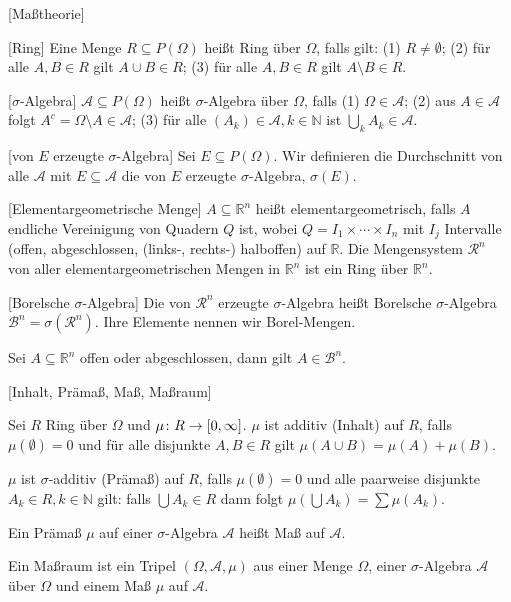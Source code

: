 \documentclass[fleqn,draft,a5paper]{article}
\theoremstyle{remark}
\begin{document}
[Maßtheorie]

[Ring]  Eine Menge \(R \subseteq P(\Omega)\) heißt Ring über \(\Omega\), falls gilt: (1) \(R
\ne \emptyset\); (2) für alle \(A, B \in R\) gilt \(A \cup B \in R\); (3) für alle \(A, B \in
R\) gilt \(A \setminus B \in R\).

[\(\sigma\)-Algebra]  \(\mathcal{A} \subseteq P(\Omega)\) heißt \(\sigma\)-Algebra über \(\Omega\), falls (1) \(\Omega \in
\mathcal{A}\); (2) aus \(A \in \mathcal{A}\) folgt \(A^{c} = \Omega \setminus A \in \mathcal{A}\); (3) für alle
\((A_{k}) \in \mathcal{A}, k \in \mathbb{N}\) ist \(\bigcup_{k}A_{k} \in \mathcal{A}\).

[von \(E\) erzeugte \(\sigma\)-Algebra] Sei \(E \subseteq P(\Omega)\).  Wir definieren
die Durchschnitt von alle \(\mathcal{A}\) mit \(E \subseteq \mathcal{A}\) die von \(E\) erzeugte
\(\sigma\)-Algebra, \(\sigma(E)\).

[Elementargeometrische Menge] \(A \subseteq \mathbb{R}^{n}\) heißt elementargeometrisch,
falls \(A\) endliche Vereinigung von Quadern \(Q\) ist, wobei
\(Q = I_{1} \times \cdots \times I_{n}\) mit \(I_{j}\) Intervalle (offen, abgeschlossen,
(links-, rechts-) halboffen) auf \(\mathbb{R}\).  Die Mengensystem
\(\mathcal{R}^{n}\) von aller elementargeometrischen Mengen in
\(\mathbb{R}^{n}\) ist ein Ring über \(\mathbb{R}^{n}\).

[Borelsche \(\sigma\)-Algebra] Die von \(\mathcal{R}^{n}\) erzeugte \(\sigma\)-Algebra heißt
Borelsche \(\sigma\)-Algebra \(\mathcal{B}^{n} = \sigma(\mathcal{R}^{n})\).  Ihre Elemente nennen wir
Borel-Mengen.

Sei \(A \subseteq \mathbb{R}^{n}\) offen oder abgeschlossen, dann gilt \(A \in \mathcal{B}^{n}\).

[Inhalt, Prämaß, Maß, Maßraum]

Sei \(R\) Ring über \(\Omega\) und \(\mu\colon R \to \interval{0}{\infty}\).  \(\mu\) ist additiv
(Inhalt) auf \(R\), falls \(\mu(\emptyset) = 0\) und für alle disjunkte \(A, B \in R\)
gilt \(\mu(A \cup B) = \mu(A) + \mu(B)\).

\(\mu\) ist \(\sigma\)-additiv (Prämaß) auf \(R\), falls \(\mu(\emptyset) = 0\) und alle
paarweise disjunkte \(A_{k} \in R, k \in \mathbb{N}\) gilt: falls \(\bigcup A_{k} \in R\) dann
folgt \(\mu\left(\bigcup A_{k}\right) = \sum \mu(A_{k})\).

Ein Prämaß \(\mu\) auf einer \(\sigma\)-Algebra \(\mathcal{A}\) heißt Maß auf \(\mathcal{A}\).

Ein Maßraum ist ein Tripel \((\Omega, \mathcal{A}, \mu)\) aus einer Menge \(\Omega\), einer
\(\sigma\)-Algebra \(\mathcal{A}\) über \(\Omega\) und einem Maß \(\mu\) auf \(\mathcal{A}\).
\end{document}
